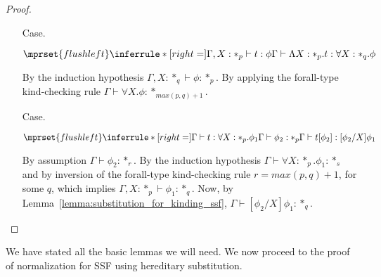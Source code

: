 \begin{proof}
\begin{itemize}
\item[Case.] \ \\
  \begin{center}
    \begin{math}
      $$\mprset{flushleft}
      \inferrule* [right=] {
        \Gamma, X : *_p \vdash t : \phi
      }{\Gamma \vdash \Lambda X:*_p.t:\forall X : *_q.\phi}
    \end{math}
  \end{center}
  By the induction hypothesis $\Gamma,X:*_q \vdash \phi:*_p$.  By applying
  the forall-type kind-checking rule $\Gamma \vdash \forall X.\phi:*_{max(p,q)+1}$.
  
\item[Case.] \ \\
  \begin{center}
    \begin{math}
      $$\mprset{flushleft}
      \inferrule* [right=] {
        \Gamma \vdash t:\forall X:*_p.\phi_1
        \\
        \Gamma \vdash \phi_2:*_p
      }{\Gamma \vdash t[\phi_2]: [\phi_2/X]\phi_1}
    \end{math}
  \end{center}
  By assumption $\Gamma \vdash \phi_2:*_r$.  By the induction hypothesis 
  $\Gamma \vdash \forall X:*_p.\phi_1:*_s$ and by inversion of the forall-type
  kind-checking rule $r = max(p,q)+1$, for some $q$, which implies 
  $\Gamma,X:*_p \vdash \phi_1:*_q$.  Now, by Lemma~\ref{lemma:substitution_for_kinding_ssf},
  $\Gamma \vdash [\phi_2/X]\phi_1:*_q$.
\end{itemize}
\end{proof}
\noindent
We have stated all the basic lemmas we will need.  We now proceed to
the proof of normalization for SSF using hereditary substitution.

